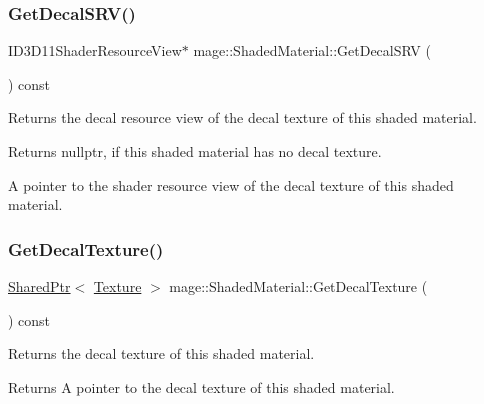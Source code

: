 \subsubsection{\texorpdfstring{Get\+Decal\+S\+R\+V()}{GetDecalSRV()}}
{\footnotesize\ttfamily I\+D3\+D11\+Shader\+Resource\+View$\ast$ mage\+::\+Shaded\+Material\+::\+Get\+Decal\+S\+RV (\begin{DoxyParamCaption}{ }\end{DoxyParamCaption}) const\hspace{0.3cm}{\ttfamily [noexcept]}}

Returns the decal resource view of the decal texture of this shaded material.

\begin{DoxyReturn}{Returns}
{\ttfamily nullptr}, if this shaded material has no decal texture. 

A pointer to the shader resource view of the decal texture of this shaded material. 
\end{DoxyReturn}
\hypertarget{structmage_1_1_shaded_material_affd31417050c3fa426791fa521c03fc9}{}\label{structmage_1_1_shaded_material_affd31417050c3fa426791fa521c03fc9} 
\subsubsection{\texorpdfstring{Get\+Decal\+Texture()}{GetDecalTexture()}}
{\footnotesize\ttfamily \hyperlink{namespacemage_a1e01ae66713838a7a67d30e44c67703e}{Shared\+Ptr}$<$ \hyperlink{classmage_1_1_texture}{Texture} $>$ mage\+::\+Shaded\+Material\+::\+Get\+Decal\+Texture (\begin{DoxyParamCaption}{ }\end{DoxyParamCaption}) const\hspace{0.3cm}{\ttfamily [noexcept]}}

Returns the decal texture of this shaded material.

\begin{DoxyReturn}{Returns}
A pointer to the decal texture of this shaded material. 
\end{DoxyReturn}
\hypertarget{structmage_1_1_shaded_material_a3e292664418846588d1e5cdc9ddc8ab5}{}\label{structmage_1_1_shaded_material_a3e292664418846588d1e5cdc9ddc8ab5} 
